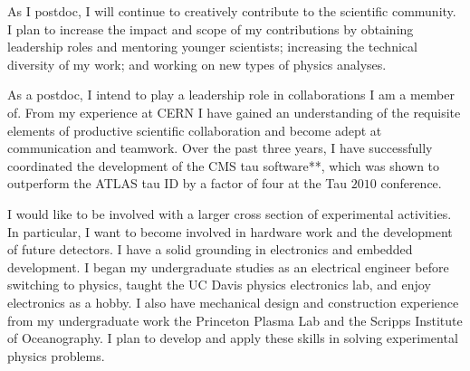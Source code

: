 \documentclass{scrartcl}        %
\begin{document}
\begin{cv}{}
As I postdoc, I will continue to creatively contribute to the scientific
community. I plan to increase the impact and scope of my contributions by
obtaining leadership roles and mentoring younger scientists; increasing the
technical diversity of my work; and working on new types of physics analyses.

As a postdoc, I intend to play a leadership role in collaborations I am a member
of. From my experience at CERN I have gained an understanding of the requisite
elements of productive scientific collaboration and become adept at
communication and teamwork. Over the past three years, I have successfully
coordinated the development of the CMS tau software**, which was shown to
outperform the ATLAS tau ID by a factor of four at the Tau $2010$ conference. 

I would like to be involved with a larger cross section of experimental
activities.  In particular, I want to become involved in hardware work and the
development of future detectors. I have a solid grounding in electronics and
embedded development. I began my undergraduate studies as an electrical engineer
before switching to physics, taught the UC Davis physics electronics lab, and
enjoy electronics as a hobby.  I also have mechanical design and construction
experience from my undergraduate work the Princeton Plasma Lab and the Scripps
Institute of Oceanography. I plan to develop and apply these skills in solving
experimental physics problems.





\end{cv}
\end{document}
